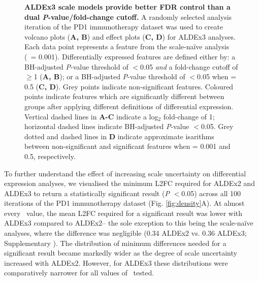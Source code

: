 \documentclass[10pt,letterpaper]{article}
\begin{document}
\begin{figure}[H]
    \centering
    \caption{\textbf{ALDEx3 scale models provide better FDR control than a dual \textit{P}-value/fold-change cutoff.} A randomly selected analysis iteration of the PD1 immunotherapy dataset was used to create volcano plots (\textbf{A, B}) and effect plots (\textbf{C, D}) for ALDEx3 analyses. Each data point represents a feature from the scale-na\"ive analysis (\textgamma~= 0.001). Differentially expressed features are defined either by: a BH-adjusted \textit{P}-value threshold of $<$0.05 \textit{and} a fold-change cutoff of $\geq$1 (\textbf{A, B}); or a BH-adjusted \textit{P}-value threshold of $<$0.05 when \textgamma = 0.5 (\textbf{C, D}). Grey points indicate non-significant features. Coloured points indicate features which are significantly different between groups after applying different definitions of differential expression. Vertical dashed lines in \textbf{A-C} indicate a log$_2$ fold-change of 1; horizontal dashed lines indicate BH-adjusted \textit{P}-value $<$0.05. Grey dotted and dashed lines in \textbf{D} indicate approximate isarithms between non-significant and significant features when \textgamma{} = 0.001 and 0.5, respectively.}
    \label{fig:volcanoEffect}
\end{figure}

To further understand the effect of increasing scale uncertainty on differential expression analyses, we visualised the minimum L2FC required for ALDEx2 and ALDEx3 to return a statistically significant result (\textit{P} $<$0.05) across all 100 iterations of the PD1 immunotherapy dataset (Fig. \ref{fig:density}A). At almost every \textgamma~value, the mean L2FC required for a significant result was lower with ALDEx3 compared to ALDEx2-- the sole exception to this being the scale-na\"ive analyses, where the difference was negligible (0.34 ALDEx2 vs. 0.36 ALDEx3; Supplementary ). The distribution of minimum differences needed for a significant result became markedly wider as the degree of scale uncertainty increased with ALDEx2. However, for ALDEx3 these distributions were comparatively narrower for all values of \textgamma~tested.
\end{document}
